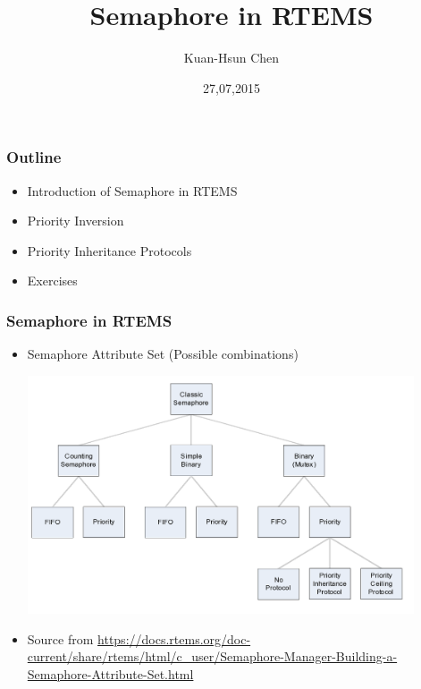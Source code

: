 \documentclass[t]{beamer}
\title{Semaphore in RTEMS}
\author{Kuan-Hsun Chen}
\institute{LS 12, TU Dortmund}
\date{27,07,2015}
\begin{document}
\maketitle

\begin{frame}
\frametitle{Outline}

\begin{itemize}

\item Introduction of Semaphore in RTEMS
\label{sec-1-1}%

\item Priority Inversion

\item Priority Inheritance Protocols

\item Exercises 

\end{itemize} %
\end{frame}

\begin{frame}
\frametitle{Semaphore in RTEMS}
\label{sec-2}
\begin{itemize}

\item Semaphore Attribute Set (Possible combinations)
\begin{center}
\includegraphics[width=0.9\textwidth]{semaphore_attributes}
\end{center}
\item \scriptsize Source from \url{https://docs.rtems.org/doc-current/share/rtems/html/c_user/Semaphore-Manager-Building-a-Semaphore-Attribute-Set.html}
\end{itemize} %

\end{frame}
\end{document}
